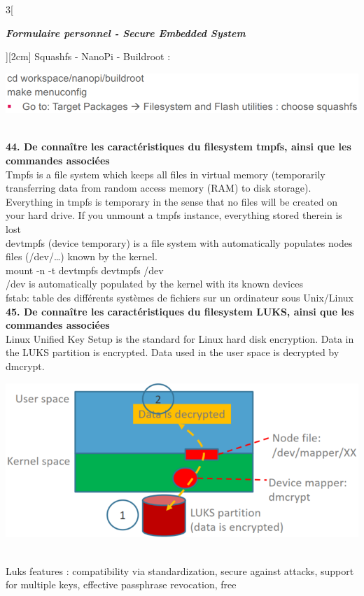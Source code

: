 \begin{multicols}{3}[\centerline{ \large\em \textbf{Formulaire personnel - Secure Embedded System}}][2cm]
Squashfs - NanoPi - Buildroot : \\
\begin{minipage}{\linewidth}
	\centering
    \includegraphics[width =\columnwidth]{images/32.png}
\end{minipage}
\\ \textbf{44. De connaître les caractéristiques du filesystem tmpfs, ainsi que les commandes associées\\}
Tmpfs is a file system which keeps all files in virtual memory (temporarily transferring data from random access memory (RAM) to disk storage).\\
Everything in tmpfs is temporary in the sense that no files will be created on
your hard drive. If you unmount a tmpfs instance, everything stored therein
is lost\\
devtmpfs (device temporary) is a file system with automatically populates nodes files (/dev/…) known by the kernel. \\
 mount -n -t devtmpfs devtmpfs /dev\\
/dev is automatically populated by the kernel with its known devices\\
fstab: table des différents systèmes de fichiers sur un ordinateur sous Unix/Linux
\\ \textbf{45. De connaître les caractéristiques du filesystem LUKS, ainsi que les commandes associées\\}
Linux Unified Key Setup is the standard for Linux hard disk encryption. Data in the LUKS partition is encrypted. Data used in the user space is decrypted by dmcrypt.\\
\begin{minipage}{\linewidth}
	\centering
    \includegraphics[width =0.6\columnwidth]{images/33.png}
\end{minipage}\\
Luks features : compatibility via standardization, secure against attacks, support for multiple keys, effective passphrase revocation, free\\

\end{multicols}
